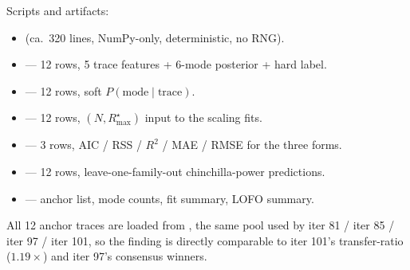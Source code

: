 Scripts and artifacts:
\begin{itemize}
\item {} (ca.\ 320 lines,
      NumPy-only, deterministic, no RNG).
\item {}
      --- 12 rows, 5 trace features + 6-mode posterior + hard label.
\item {}
      --- 12 rows, soft $P(\mathrm{mode} \mid \mathrm{trace})$.
\item {}
      --- 12 rows, $(N, R_\mathrm{max}^\star)$ input to the scaling fits.
\item {}
      --- 3 rows, AIC / RSS / $R^2$ / MAE / RMSE for the three forms.
\item {}
      --- 12 rows, leave-one-family-out chinchilla-power predictions.
\item {}
      --- anchor list, mode counts, fit summary, LOFO summary.
\end{itemize}

All 12 anchor traces are loaded from
,
the same pool used by iter 81 / iter 85 / iter 97 / iter 101, so the
finding is directly comparable to iter 101's transfer-ratio
($1.19\times$) and iter 97's consensus winners.

